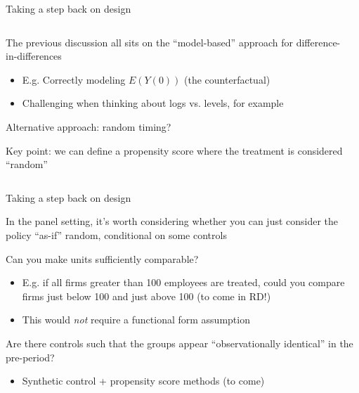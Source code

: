 \documentclass[notes,11pt, aspectratio=169]{beamer}
\newenvironment{wideitemize}{\itemize\addtolength{\itemsep}{10pt}}{\enditemize}
\begin{document}
\begin{frame}{Taking a step back on design}
  \begin{columns}[T] %
    \begin{column}{0.4\textwidth}
      \begin{wideitemize}
      \item The previous discussion all sits on the ``model-based'' approach for difference-in-differences
        \begin{itemize}
        \item E.g. Correctly modeling $E(Y(0))$ (the counterfactual)
        \item Challenging when thinking about logs vs. levels, for example
        \end{itemize}
      \item Alternative approach: random timing?
      \item<2-> Key point: we can define a propensity score where the treatment is considered ``random''
      \end{wideitemize}
    \end{column}%
    \hfill%
    \begin{column}{.5\textwidth}
    \end{column}
    \end{columns}
\end{frame}

\begin{frame}{Taking a step back on design}
  \begin{wideitemize}
  \item In the panel setting, it's worth considering whether you can just consider the policy ``as-if'' random, conditional on some controls
  \item Can you make units sufficiently comparable?
    \begin{itemize}
    \item E.g. if all firms greater than 100 employees are treated,
      could you compare firms just below 100 and just above 100 (to
      come in RD!)
    \item This would \emph{not} require a functional form assumption
    \end{itemize}
  \item Are there controls such that the groups appear ``observationally identical'' in the pre-period?
    \begin{itemize}
    \item Synthetic control + propensity score methods (to come)
    \end{itemize}
  \end{wideitemize}
\end{frame}
\end{document}
